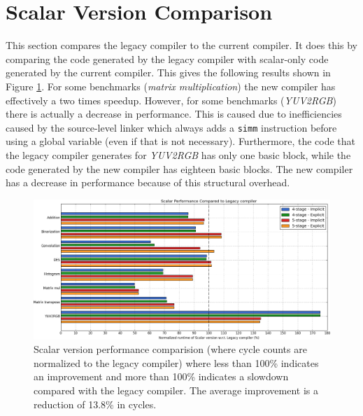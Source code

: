 \section{Scalar Version Comparison}
This section compares the legacy compiler to the current compiler. It does this by comparing the code generated by the legacy compiler with scalar-only code generated by the current compiler. This gives the following results shown in Figure \ref{fig:legacy_scalar_cmp}. For some benchmarks (\emph{matrix multiplication}) the new compiler has effectively a two times speedup. However, for some benchmarks (\emph{YUV2RGB}) there is actually a decrease in performance. This is caused due to inefficiencies caused by the source-level linker which always adds a \texttt{simm} instruction before using a global variable (even if that is not necessary). Furthermore, the code that the legacy compiler generates for \emph{YUV2RGB} has only one basic block, while the code generated by the new compiler has eighteen basic blocks. The new compiler has a decrease in performance because of this structural overhead. 



\begin{figure}[H]
\centering
\hspace*{-.12in}
\includegraphics[width=\textwidth]{figures/stats/scalar_cycles}
\caption{Scalar version performance comparision (where cycle counts are normalized to the legacy compiler) where less than 100\% indicates an improvement and more than 100\% indicates a slowdown compared with the legacy compiler. The average improvement is a reduction of 13.8\% in cycles.}
\label{fig:legacy_scalar_cmp}
\end{figure}

